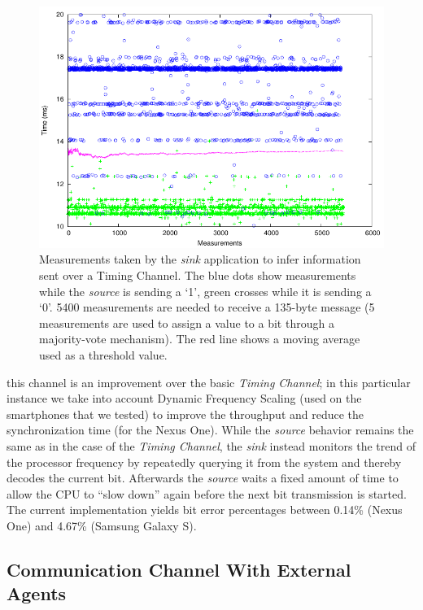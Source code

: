 \begin{figure}[!t]
  \centering
  \includegraphics[scale=.65]{figures/securingphone/channels_timingpaper_weight}
  \caption[Measurements taken by the \emph{sink} application to infer
    information sent over a Timing Channel]{Measurements taken by the \emph{sink} application to infer
    information sent over a Timing Channel. The blue dots show
    measurements while the \emph{source} is sending a `1', green
    crosses while it is sending a `0'. 5400 measurements are needed to
    receive a 135-byte message (5 measurements are used to assign a
    value to a bit through a majority-vote mechanism). The red line
    shows a moving average used as a threshold value.}
  \label{fig:sp_appcollusion_timing}
\end{figure}

 this channel is an improvement
over the basic \emph{Timing Channel}; in this particular instance we
take into account Dynamic Frequency Scaling (used on the smartphones
that we tested) to improve the throughput and reduce the
synchronization time (for the Nexus One). While the \emph{source}
behavior remains the same as in the case of the \emph{Timing Channel},
the \emph{sink} instead monitors the trend of the processor frequency
by repeatedly querying it from the system and thereby decodes the
current bit. Afterwards the \emph{source} waits a fixed amount of time
to allow the CPU to ``slow down'' again before the next bit
transmission is started. The current implementation yields bit error
percentages between 0.14\% (Nexus One) and 4.67\% (Samsung Galaxy S).

\subsection{Communication Channel With External Agents}
\label{sec:sp_appcollusion_browserchannel}

